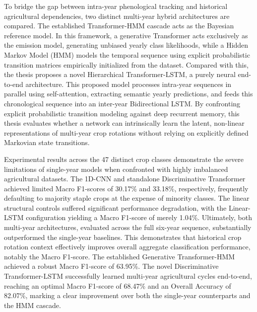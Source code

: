 To bridge the gap between intra-year phenological tracking and historical agricultural dependencies,
two distinct multi-year hybrid architectures are compared.
The established Transformer-HMM cascade acts as the Bayesian reference model.
In this framework, a generative Transformer acts exclusively as the emission model,
generating unbiased yearly class likelihoods, while a Hidden Markov Model (HMM) models the temporal
sequence using explicit probabilistic transition matrices empirically initialized from the dataset.
Compared with this, the thesis proposes a novel Hierarchical Transformer-LSTM,
a purely neural end-to-end architecture.
This proposed model processes intra-year sequences in parallel using self-attention,
extracting semantic yearly predictions, and feeds this chronological sequence into an inter-year
Bidirectional LSTM.
By confronting explicit probabilistic transition modeling against deep recurrent memory,
this thesis evaluates whether a network can intrinsically learn the latent,
non-linear representations of multi-year crop rotations without relying on explicitly
defined Markovian state transitions.

Experimental results across the 47 distinct crop classes demonstrate the severe limitations
of single-year models when confronted with highly imbalanced agricultural datasets.
The 1D-CNN and standalone Discriminative Transformer achieved limited Macro
F1-scores of 30.17\% and 33.18\%, respectively, frequently defaulting to majority staple
crops at the expense of minority classes.
The linear structural controls suffered significant performance degradation,
with the Linear-LSTM configuration yielding a Macro F1-score of merely 1.04\%.
Ultimately, both multi-year architectures, evaluated across the full six-year sequence,
substantially outperformed the single-year baselines.
This demonstrates that historical crop rotation context effectively improves overall
aggregate classification performance, notably the Macro F1-score.
The established Generative Transformer-HMM achieved a robust Macro F1-score of 63.95\%.
The novel Discriminative Transformer-LSTM successfully learned multi-year agricultural cycles end-to-end,
reaching an optimal Macro F1-score of 68.47\% and an Overall Accuracy of 82.07\%,
marking a clear improvement over both the single-year counterparts and the HMM cascade.

